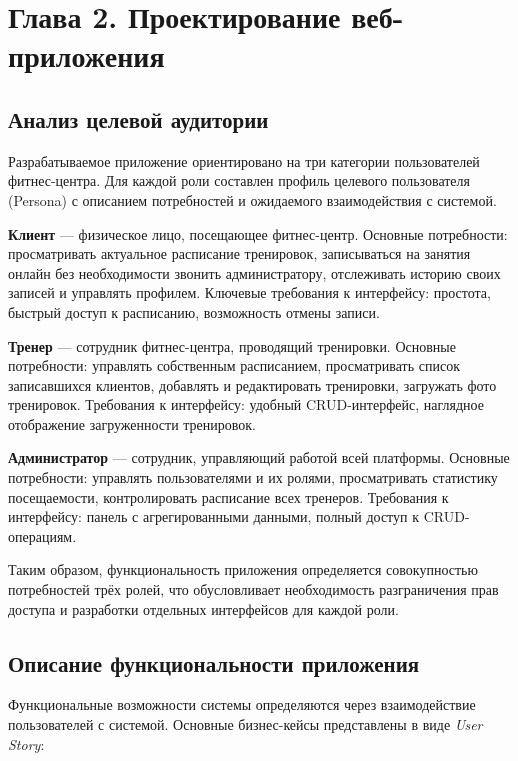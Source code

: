 \section*{Глава 2. Проектирование веб-приложения}

\subsection{Анализ целевой аудитории}

Разрабатываемое приложение ориентировано на три категории пользователей фитнес-центра.
Для каждой роли составлен профиль целевого пользователя (Persona) с описанием
потребностей и ожидаемого взаимодействия с системой.

\textbf{Клиент} --- физическое лицо, посещающее фитнес-центр. Основные потребности:
просматривать актуальное расписание тренировок, записываться на занятия онлайн без
необходимости звонить администратору, отслеживать историю своих записей и управлять
профилем. Ключевые требования к интерфейсу: простота, быстрый доступ к расписанию,
возможность отмены записи.

\textbf{Тренер} --- сотрудник фитнес-центра, проводящий тренировки. Основные
потребности: управлять собственным расписанием, просматривать список записавшихся
клиентов, добавлять и редактировать тренировки, загружать фото тренировок.
Требования к интерфейсу: удобный CRUD-интерфейс, наглядное отображение
загруженности тренировок.

\textbf{Администратор} --- сотрудник, управляющий работой всей платформы.
Основные потребности: управлять пользователями и их ролями, просматривать
статистику посещаемости, контролировать расписание всех тренеров. Требования
к интерфейсу: панель с агрегированными данными, полный доступ к CRUD-операциям.

Таким образом, функциональность приложения определяется совокупностью потребностей
трёх ролей, что обусловливает необходимость разграничения прав доступа и разработки
отдельных интерфейсов для каждой роли.

\subsection{Описание функциональности приложения}

Функциональные возможности системы определяются через взаимодействие пользователей
с системой. Основные бизнес-кейсы представлены в виде \textit{User Story}:

